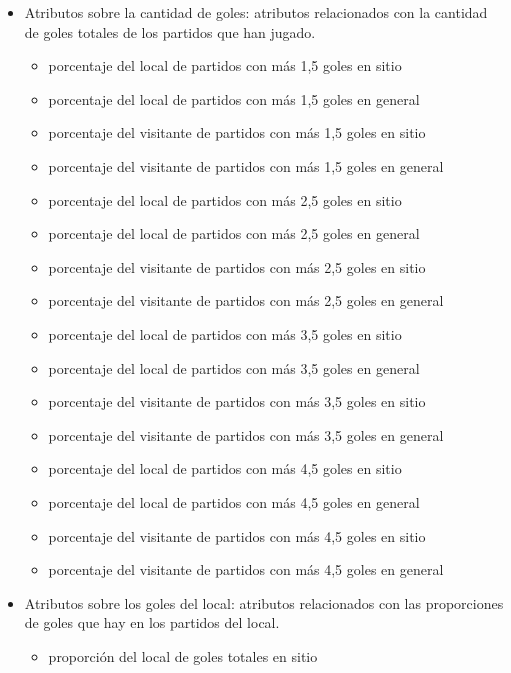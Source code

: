 \begin{itemize}
    \item Atributos sobre la cantidad de goles: atributos relacionados con la cantidad de goles totales de los partidos que han jugado.
          \begin{itemize}
              \item porcentaje del local de partidos con más 1,5 goles en sitio
              \item porcentaje del local de partidos con más 1,5 goles en general
              \item porcentaje del visitante de partidos con más 1,5 goles en sitio
              \item porcentaje del visitante de partidos con más 1,5 goles en general
              \item porcentaje del local de partidos con más 2,5 goles en sitio
              \item porcentaje del local de partidos con más 2,5 goles en general
              \item porcentaje del visitante de partidos con más 2,5 goles en sitio
              \item porcentaje del visitante de partidos con más 2,5 goles en general
              \item porcentaje del local de partidos con más 3,5 goles en sitio
              \item porcentaje del local de partidos con más 3,5 goles en general
              \item porcentaje del visitante de partidos con más 3,5 goles en sitio
              \item porcentaje del visitante de partidos con más 3,5 goles en general
              \item porcentaje del local de partidos con más 4,5 goles en sitio
              \item porcentaje del local de partidos con más 4,5 goles en general
              \item porcentaje del visitante de partidos con más 4,5 goles en sitio
              \item porcentaje del visitante de partidos con más 4,5 goles en general
          \end{itemize}
    \item Atributos sobre los goles del local: atributos relacionados con las proporciones de goles que hay en los partidos del local.
          \begin{itemize}
              \item proporción del local de goles totales en sitio

\end{itemize}
\end{itemize}
